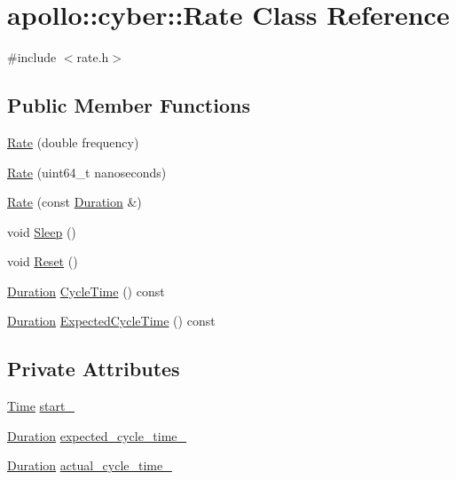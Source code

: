 \hypertarget{classapollo_1_1cyber_1_1Rate}{\section{apollo\-:\-:cyber\-:\-:Rate Class Reference}
\label{classapollo_1_1cyber_1_1Rate}
}


{\ttfamily \#include $<$rate.\-h$>$}

\subsection*{Public Member Functions}
\begin{DoxyCompactItemize}
\item 
\hyperlink{classapollo_1_1cyber_1_1Rate_af025b00cc7363ee361a838f0e11f6011}{Rate} (double frequency)
\item 
\hyperlink{classapollo_1_1cyber_1_1Rate_aaad1dfe4150956c1150fa9bcc62c92b2}{Rate} (uint64\-\_\-t nanoseconds)
\item 
\hyperlink{classapollo_1_1cyber_1_1Rate_a97b58bfd0083b352ceef1d761f8006ce}{Rate} (const \hyperlink{classapollo_1_1cyber_1_1Duration}{Duration} \&)
\item 
void \hyperlink{classapollo_1_1cyber_1_1Rate_aab3944f01c184fddf0b7ce63e8153680}{Sleep} ()
\item 
void \hyperlink{classapollo_1_1cyber_1_1Rate_a7e1ba3e659a190a541fc5bbd079cf174}{Reset} ()
\item 
\hyperlink{classapollo_1_1cyber_1_1Duration}{Duration} \hyperlink{classapollo_1_1cyber_1_1Rate_a41fab63baca78a6b13694b84bdc4ab2a}{Cycle\-Time} () const 
\item 
\hyperlink{classapollo_1_1cyber_1_1Duration}{Duration} \hyperlink{classapollo_1_1cyber_1_1Rate_ade9811c44704cabf1d1f03f5969fc15e}{Expected\-Cycle\-Time} () const 
\end{DoxyCompactItemize}
\subsection*{Private Attributes}
\begin{DoxyCompactItemize}
\item 
\hyperlink{classapollo_1_1cyber_1_1Time}{Time} \hyperlink{classapollo_1_1cyber_1_1Rate_a2954553100471ee5dfb8042ca86e9715}{start\-\_\-}
\item 
\hyperlink{classapollo_1_1cyber_1_1Duration}{Duration} \hyperlink{classapollo_1_1cyber_1_1Rate_a12b46377964c965f263e5014fc1d359a}{expected\-\_\-cycle\-\_\-time\-\_\-}
\item 
\hyperlink{classapollo_1_1cyber_1_1Duration}{Duration} \hyperlink{classapollo_1_1cyber_1_1Rate_aca1869f7d2d01493446fc266b01e3a21}{actual\-\_\-cycle\-\_\-time\-\_\-}
\end{DoxyCompactItemize}



